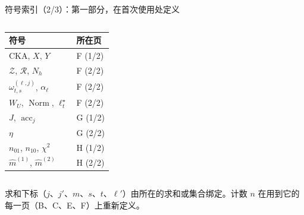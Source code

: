 \documentclass[aspectratio=169,11pt]{beamer}
\newcommand{\acc}{\operatorname{acc}}
\newcommand{\gnote}[1]{{\scriptsize\color{cGray}#1}}
\begin{document}
\begin{frame}{符号索引（2/3）：第一部分，在首次使用处定义}
\begin{columns}[T]
\begin{tabular}{@{}ll@{}}
\toprule
\textbf{符号} & \textbf{所在页}\\ \midrule
$\mathrm{CKA}$, $X$, $Y$ & F (1/2)\\
$\mathcal Z$, $\mathcal R$, $N_h$ & F (2/2)\\
$\omega^{(\ell,j)}_{t,s}$, $\alpha_\ell$ & F (2/2)\\
$W_U$, $\operatorname{Norm}$, $\ell^\star_t$ & F (2/2)\\
$J$, $\acc_j$ & G (1/2)\\
$\eta$ & G (2/2)\\
$n_{01}$, $n_{10}$, $\chi^2$ & H (1/2)\\
$\hat m^{(1)}$, $\hat m^{(2)}$ & H (2/2)\\
\bottomrule
\end{tabular}
\end{columns}
\vspace{4pt}
\gnote{求和下标（$j$、$j'$、$m$、$s$、$t$、$\ell'$）由所在的求和或集合绑定。计数 $n$ 在用到它的每一页（B、C、E、F）上重新定义。}
\end{frame}
\end{document}

